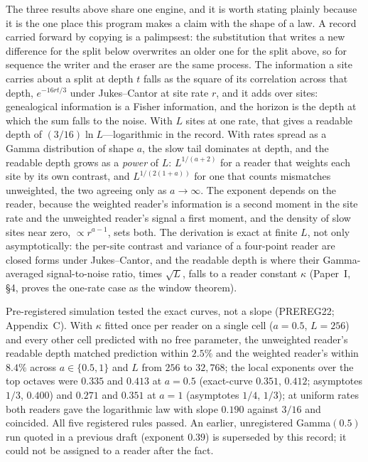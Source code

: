 \documentclass[11pt]{article}
\begin{document}
The three results above share one engine, and it is worth stating plainly because it is the one place this program makes a claim with the shape of a law. A record carried forward by copying is a palimpsest: the substitution that writes a new difference for the split below overwrites an older one for the split above, so for sequence the writer and the eraser are the same process. The information a site carries about a split at depth $t$ falls as the square of its correlation across that depth, $e^{-16rt/3}$ under Jukes--Cantor at site rate $r$, and it adds over sites: genealogical information is a Fisher information, and the horizon is the depth at which the sum falls to the noise. With $L$ sites at one rate, that gives a readable depth of $(3/16)\ln L$---logarithmic in the record. With rates spread as a Gamma distribution of shape $a$, the slow tail dominates at depth, and the readable depth grows as a \emph{power} of $L$: $L^{1/(a+2)}$ for a reader that weights each site by its own contrast, and $L^{1/(2(1+a))}$ for one that counts mismatches unweighted, the two agreeing only as $a\to\infty$. The exponent depends on the reader, because the weighted reader's information is a second moment in the site rate and the unweighted reader's signal a first moment, and the density of slow sites near zero, $\propto r^{a-1}$, sets both. The derivation is exact at finite $L$, not only asymptotically: the per-site contrast and variance of a four-point reader are closed forms under Jukes--Cantor, and the readable depth is where their Gamma-averaged signal-to-noise ratio, times $\sqrt L$, falls to a reader constant $\kappa$ (Paper~I, \S4, proves the one-rate case as the window theorem).

Pre-registered simulation tested the exact curves, not a slope (PREREG22; Appendix~C). With $\kappa$ fitted once per reader on a single cell ($a=0.5$, $L=256$) and every other cell predicted with no free parameter, the unweighted reader's readable depth matched prediction within $2.5\%$ and the weighted reader's within $8.4\%$ across $a\in\{0.5,1\}$ and $L$ from $256$ to $32{,}768$; the local exponents over the top octaves were $0.335$ and $0.413$ at $a=0.5$ (exact-curve $0.351$, $0.412$; asymptotes $1/3$, $0.400$) and $0.271$ and $0.351$ at $a=1$ (asymptotes $1/4$, $1/3$); at uniform rates both readers gave the logarithmic law with slope $0.190$ against $3/16$ and coincided. All five registered rules passed. An earlier, unregistered Gamma$(0.5)$ run quoted in a previous draft (exponent $0.39$) is superseded by this record; it could not be assigned to a reader after the fact.
\end{document}
